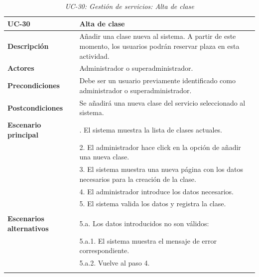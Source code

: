 \begin{table}
  \begin{center}
    \begin{tabularx}{16.4cm}{|l|X|}
      \hline
      \textbf{UC-30} & \textbf{Alta de clase}\\
      \hline
      \textbf{Descripción} & Añadir una clase nueva al sistema. A partir de este momento, los usuarios podrán reservar plaza en esta actividad.\\
      \hline
      \textbf{Actores} & Administrador o superadministrador.\\
      \hline
      \textbf{Precondiciones} & Debe ser un usuario previamente identificado como administrador o superadministrador.\\
      \hline
      \textbf{Postcondiciones} & Se añadirá una nueva clase del servicio seleccionado al sistema.\\
      \hline
      \textbf{Escenario principal} & \smallskip 1. El sistema muestra la lista de clases actuales.\\
      & 2. El administrador hace click en la opción de añadir una nueva clase.\\
      & 3. El sistema muestra una nueva página con los datos necesarios para la creación de la clase.\\
      & 4. El administrador introduce los datos necesarios.\\
      & 5. El sistema valida los datos y registra la clase.\\
      & \\
      \hline
      \textbf{Escenarios alternativos} & \smallskip 5.a. Los datos introducidos no son válidos:\\
      & \hspace{0.3cm} 5.a.1. El sistema muestra el mensaje de error correspondiente.\\
      & \hspace{0.3cm} 5.a.2. Vuelve al paso 4.\\
      & \\
      \hline
    \end{tabularx}
    \caption{\textit{UC-30: Gestión de servicios: Alta de clase}}
    \label{tab:CU-alta-clase}
  \end{center}
\end{table}



